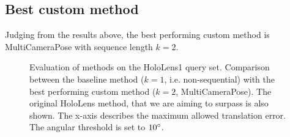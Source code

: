 \documentclass[twoside]{ctuthesis}
\theoremstyle{plain}
\theoremstyle{definition}
\theoremstyle{note}
\begin{document}
\subsection{Best custom method}

Judging from the results above, the best performing custom method is MultiCameraPose with sequence length $k=2$. 

\begin{figure}[htb!]
	\centering
	
	\caption{Evaluation of methods on the HoloLens1 query set. Comparison between the baseline method ($k=1$, i.e. non-sequential) with the best performing custom method ($k=2$, MultiCameraPose). The original HoloLens method, that we are aiming to surpass is also shown. The x-axis describes the maximum allowed translation error. The angular threshold is set to $10\degree$.}
	\label{fig:HL1-dist-thresh-vs-accuracy}
\end{figure}
\end{document}
